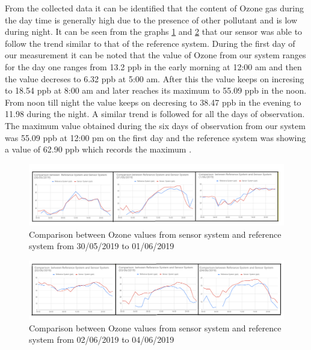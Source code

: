   
  From the collected data it can be identified that the content of Ozone gas during the day time is generally high due to the presence of other pollutant and is low during night. It can be seen from the graphs \ref{Ozone} and \ref{Ozone1} that our sensor was able to follow the trend similar to that of the reference system. During the first day of our measurement it can be noted that the value of Ozone from our system ranges for the day one ranges from 13.2 ppb in the early morning at 12:00 am and then the value decreses to  6.32 ppb at 5:00 am. After this the value keeps on incresing to 18.54 ppb at 8:00 am and later reaches its maximum to 55.09 ppb in the noon. From noon till night the value keeps on decresing to 38.47 ppb in the evening to 11.98 during the night. A similar trend is followed for all the days of observation. The maximum value obtained during the six days of observation from our system was 55.09 ppb at 12:00 pm on the first day and the reference system was showing a value of 62.90 ppb which records the maximum .

    
  \begin{figure}[h]
    \begin{center}
    \includegraphics[scale=0.70]{images/figure21.png}
    \end{center}
    \caption{Comparison between Ozone values from sensor system and reference system from 30/05/2019 to 01/06/2019}
    \label{Ozone}
    \bigskip



  \end{figure}
  \bigskip
  \begin{figure}[h]
    \begin{center}
    \includegraphics[scale=0.70]{images/figure22.png}
    \end{center}
    \caption{Comparison between Ozone values from sensor system and reference system from 02/06/2019 to 04/06/2019}
    \label{Ozone1}

  \end{figure}
  

